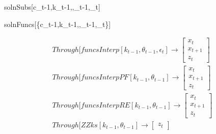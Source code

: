 \documentclass[12pt]{article}
\begin{document}
\begin{pseudocode}{solnSubs}{[c_{t-1},k_{t-1},,\theta_{t-1},\epsilon_t]}
\end{pseudocode}


\begin{pseudocode}{solnFuncs}{[\{c_{t-1},k_{t-1},,\theta_{t-1},\epsilon_t\}]}
\end{pseudocode}

 \begin{gather}
 Through[funcsInterp[k_{t-1},\theta_{t-1},\epsilon_t] \rightarrow
 \begin{bmatrix}
   x_t\\x_{t+1}\\z_t
 \end{bmatrix}
 \\
 Through[funcsInterpPF[k_{t-1},\theta_{t-1}]\rightarrow
 \begin{bmatrix}
   x_t\\x_{t+1}\\z_t
 \end{bmatrix}
\\
 Through[funcsInterpRE[k_{t-1},\theta_{t-1}]\rightarrow
 \begin{bmatrix}
   x_t\\x_{t+1}\\z_t
 \end{bmatrix}
\\
 Through[ZZks[k_{t-1},\theta_{t-1}]\rightarrow
 \begin{bmatrix}
z_t
 \end{bmatrix}
\\
 \end{gather}



\end{document}
